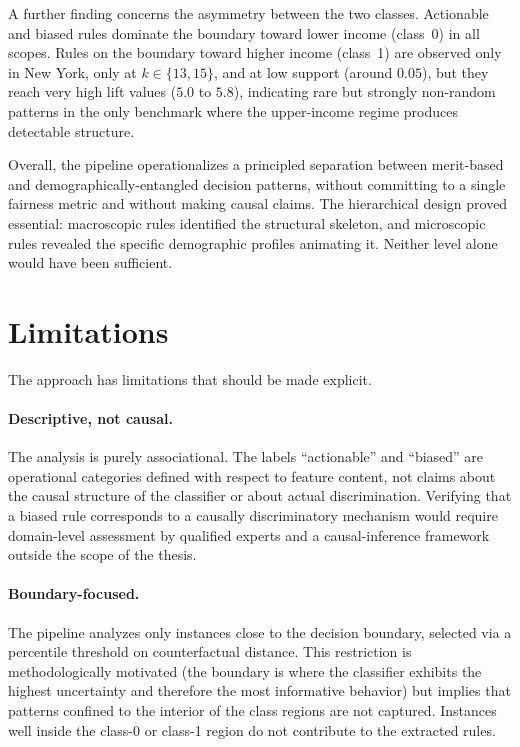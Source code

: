 A further finding concerns the asymmetry between the two classes. Actionable and biased rules dominate the boundary toward lower income (class~0) in all scopes. Rules on the boundary toward higher income (class~1) are observed only in New York, only at $k \in \{13, 15\}$, and at low support (around $0.05$), but they reach very high lift values ($5.0$ to $5.8$), indicating rare but strongly non-random patterns in the only benchmark where the upper-income regime produces detectable structure.

Overall, the pipeline operationalizes a principled separation between merit-based and demographically-entangled decision patterns, without committing to a single fairness metric and without making causal claims. The hierarchical design proved essential: macroscopic rules identified the structural skeleton, and microscopic rules revealed the specific demographic profiles animating it. Neither level alone would have been sufficient.

\section{Limitations}
\label{sec:conclusions-limitations}

The approach has limitations that should be made explicit.

\paragraph{Descriptive, not causal.} The analysis is purely associational. The labels ``actionable'' and ``biased'' are operational categories defined with respect to feature content, not claims about the causal structure of the classifier or about actual discrimination. Verifying that a biased rule corresponds to a causally discriminatory mechanism would require domain-level assessment by qualified experts and a causal-inference framework outside the scope of the thesis.

\paragraph{Boundary-focused.} The pipeline analyzes only instances close to the decision boundary, selected via a percentile threshold on counterfactual distance. This restriction is methodologically motivated (the boundary is where the classifier exhibits the highest uncertainty and therefore the most informative behavior) but implies that patterns confined to the interior of the class regions are not captured. Instances well inside the class-0 or class-1 region do not contribute to the extracted rules.

